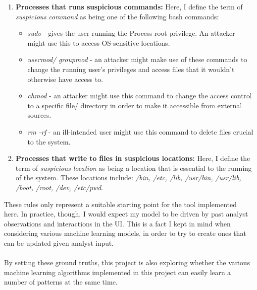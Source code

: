 \begin{enumerate}
		\item \textbf{Processes that runs suspicious commands: }Here, I define the term of \textit{suspicious command} as being one of the following bash commands:
		\begin{itemize}
			\item \textit{sudo} - gives the user running the Process root privilege. An attacker might use this to access OS-sensitive locations. 
			\item \textit{usermod/ groupmod} - an attacker might make use of these commands to change the running user's privileges and access files that it wouldn't otherwise have access to.
			\item \textit{chmod} - an attacker might use this command to change the access control to a specific file/ directory in order to make it accessible from external sources.
			\item \textit{rm -rf} - an ill-intended user might use this command to delete files crucial to the system. 
		\end{itemize}
	
		\item \textbf{Processes that write to files in suspicious locations: }Here, I define the term of \textit{suspicious location} as being a location that is essential to the running of the system. These locations include:  \textit{/bin, /etc, /lib, /usr/bin, /usr/lib, /boot, /root, /dev, /etc/pwd}.
	\end{enumerate}
	These rules only represent a suitable starting point for the tool implemented here. In practice, though, I would expect my model to be driven by past analyst observations and interactions in the UI. This is a fact I kept in mind when considering various machine learning models, in order to try to create ones that can be updated given analyst input.
	\\ \\
	By setting these ground truths, this project is also exploring whether the various machine learning algorithms implemented in this project can easily learn a number of patterns at the same time.
